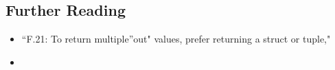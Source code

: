 \subsection[Further Reading]{Further Reading}\label{further-reading}

\begin{itemize}
\item{``F.21: To return multiple''out" values, prefer returning a struct or tuple," \cite{stroustrup20}}
\item{\cite{vandevoorde18}}
\end{itemize}


